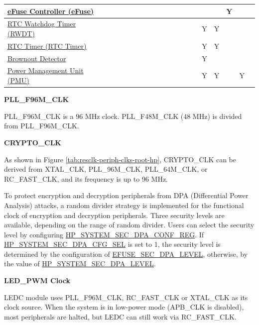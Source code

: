 \documentclass[main\_\_EN.tex]{subfiles}
\begin{document}
\begin{landscape}
\begin{tiny}
\begin{longtable}[c]{|m{2.1cm}|c|c|c|c|c|c|c|c|c|C{1.4cm}|c|c|c|c|c|c|c|c|c| }
    \hyperref[mod:efuse]{eFuse Controller (eFuse)} &  &  &  &  &  &  &  &  &  &  &  &  &  &  &  &  & Y &  &  \\ \hline
    \hyperref[mod:wdt]{RTC Watchdog Timer (RWDT)}  &  &  &  &  &  &  &  &  &  &  &  &  &  &  & Y & Y &  &  &  \\ \hline
    \hyperref[mod:lowpowm]{RTC Timer (RTC Timer)}  &  &  &  &  &  &  &  &  &  &  &  &  &  &  & Y & Y &  &  &  \\ \hline
    \hyperref[mod:lowpowm]{Brownout Detector} &  &  &  &  &  &  &  &  &  &  &  &  &  &  & Y &  &  &  &  \\ \hline
    \hyperref[mod:lowpowm]{Power Management Unit (PMU)} &  &  &  &  &  &  &  &  &  &  &  &  &  &  & Y & Y &  & Y &  \\ \hline
\end{longtable}
\end{tiny}

\end{landscape}

\textbf{PLL\_F96M\_CLK}

PLL\_F96M\_CLK is a 96 MHz clock. PLL\_F48M\_CLK (48 MHz) is divided from PLL\_F96M\_CLK.


\textbf{CRYPTO\_CLK}

As shown in Figure \ref{tab:resclk-periph-clks-root-hp}, CRYPTO\_CLK can be derived from XTAL\_CLK, PLL\_96M\_CLK, PLL\_64M\_CLK, or RC\_FAST\_CLK, and its frequency is up to 96 MHz.


To protect encryption and decryption peripherals from DPA (Differential Power Analysis) attacks, a random divider strategy is implemented for the functional clock of encryption and decryption peripherals. Three security levels are available, depending on the range of random divider. Users can select the security level by configuring  \hyperref[regdesc:HPSYSTEMSECDPACONFREG]{HP\_SYSTEM\_SEC\_DPA\_CONF\_REG}. If  \hyperref[fielddesc:HPSYSTEMSECDPACFGSEL]{HP\_SYSTEM\_SEC\_DPA\_CFG\_SEL} is set to 1, the security level is determined by the configuration of \hyperref[fielddesc:EFUSESECDPALEVEL]{EFUSE\_SEC\_DPA\_LEVEL}, otherwise, by the value of  \hyperref[fielddesc:HPSYSTEMSECDPALEVEL]{HP\_SYSTEM\_SEC\_DPA\_LEVEL}.


\textbf{LED\_PWM Clock}

LEDC module uses PLL\_F96M\_CLK, RC\_FAST\_CLK or XTAL\_CLK as its clock source. When the system is in low-power mode (APB\_CLK is disabled), most peripherals are halted, but LEDC can still work via RC\_FAST\_CLK.
\end{document}
